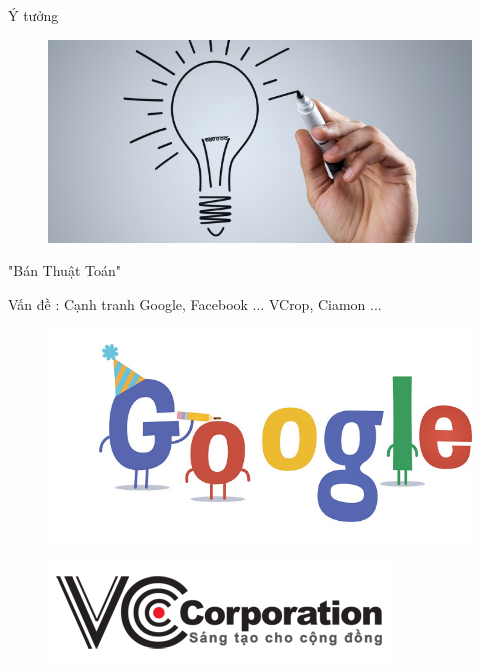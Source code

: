 \documentclass{beamer}
\begin{document}
\begin{frame}{Ý tưởng}
\begin{center}
\begin{figure}
\begin{center}
\includegraphics[scale=0.2]{2.jpg}
\end{center}

\end{figure}
\Large{"Bán Thuật Toán"} \\


\end{center} 
Vấn đề : Cạnh tranh Google,  Facebook ... VCrop, Ciamon ...
\begin{figure}
\begin{center}
\includegraphics[scale=0.2]{4.jpg}
\end{center}

\end{figure}
\begin{figure}
\begin{center}
\includegraphics[scale=0.2]{6.png}
\end{center}

\end{figure}
\end{frame}
\end{document}
